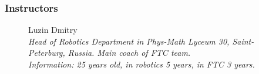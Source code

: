 \subsubsection{Instructors}

\begin{figure}[H]
	
	\begin{minipage}[h]{0.47\linewidth}
		Luzin Dmitry\\
		\emph{Head of Robotics Department in Phys-Math Lyceum 30, Saint-Peterburg, Russia. Main coach of FTC team.\\}
		\emph{Information: 25 years old, in robotics 5 years, in FTC 3 years.}
	\end{minipage}
	\hfill
	\begin{minipage}{0.47\linewidth}
		\\
	\end{minipage}
	\vfill
	\begin{minipage}[h]{0.47\linewidth}

\end{minipage}
\end{figure}
